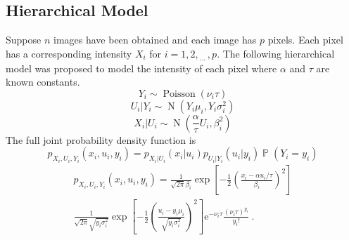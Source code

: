 \documentclass[12pt]{report}
\DeclareMathOperator{\prob}{\mathbb{P}}
\DeclareMathOperator{\normal}{N}
\DeclareMathOperator{\poisson}{Poisson}
\newcommand{\euler}{\mathrm{e}}
\newcommand{\dotdotdot}{_{\phantom{.}\cdots}}
\begin{document}
\subsection{Hierarchical Model}
Suppose $n$ images have been obtained and each image has $p$ pixels. Each pixel has a corresponding intensity $X_i$ for $i=1,2,\dotdotdot,p$. The following hierarchical model was proposed to model the intensity of each pixel where $\alpha$ and $\tau$ are known constants.
\begin{equation}
Y_i\sim\poisson(\nu_i \tau)
\end{equation}
\begin{equation}
U_i|Y_i\sim\normal\left(
Y_i\mu_i,Y_i\sigma_i^2
\right)
\end{equation}
\begin{equation}
X_i|U_i\sim\normal\left(
\frac{\alpha}{\tau}U_i,\beta_i^2
\right)
\end{equation}
The full joint probability density function is
\begin{equation}
p_{X_i,U_i,Y_i}\left(x_i,u_i,y_i\right)=
p_{X_i|U_i}(x_i|u_i)p_{U_i|Y_i}(u_i|y_i)\prob(Y_i=y_i)
\end{equation}
\begin{multline}
p_{X_i,U_i,Y_i}\left(x_i,u_i,y_i\right)=
\frac{1}{\sqrt{2\pi}\beta_i}\exp\left[-\frac{1}{2}\left(\frac{x_i-\alpha u_i /\tau}{\beta_i}\right)^2\right]
\\
\frac{1}{\sqrt{2\pi}\sqrt{y_i\sigma_i^2}}\exp\left[-\frac{1}{2}\left(\frac{u_i-y_i\mu_i}{\sqrt{y_i\sigma_i^2}}\right)^2\right]
\euler^{-\nu_i\tau}\frac{(\nu_i\tau)^{y_i}}{y_i!} \ .
\end{multline}
\end{document}

